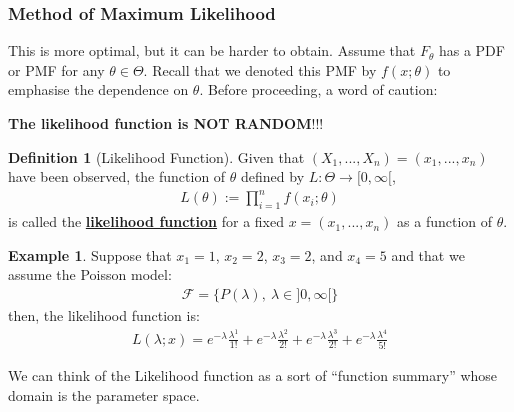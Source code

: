 \documentclass[11pt]{scrartcl}
\theoremstyle{definition}
\newtheorem{definition}{Definition}
\newtheorem{ex}{Example}
\theoremstyle{remark}
\newcommand{\dfn}[1]{\textbf{\underline{#1}}}
\newcommand{\dist}[0]{\mathcal{F}}
\begin{document}
{	

\subsubsection{Method of Maximum Likelihood}
This is more optimal, but it can be harder to obtain. Assume that $F_\theta$ has a PDF or PMF for any $\theta \in \Theta$. Recall that we denoted this PMF by $f(x; \theta)$ to emphasise the dependence on $\theta$. Before proceeding, a word of caution: 

\begin{center}
	\textbf{The likelihood function is NOT RANDOM}!!! 
\end{center}

\begin{definition}[Likelihood Function]
	Given that $(X_1, ..., X_n) = (x_1, ..., x_n)$ have been observed, the function of $\theta$ defined by $L: \Theta \rightarrow [0, \infty[$,
	\begin{align}
		L(\theta) := \prod_{i=1}^n f(x_i; \theta) 
	\end{align}
	is called the \dfn{likelihood function} for a fixed $x = (x_1, ..., x_n)$ as a function of $\theta$. 
\end{definition}

\begin{ex} 
	Suppose that $x_1 = 1$, $x_2 = 2$, $x_3 = 2$, and $x_4 =5$ and that we assume the Poisson model: 
	\begin{align*}
		\dist = \{ P(\lambda),\ \lambda \in ]0, \infty[ \} 	
	\end{align*}
	then, the likelihood function is: 
	\begin{align*}
		L(\lambda; x) = e^{-\lambda} \frac{\lambda^1}{1!}	+  e^{-\lambda} \frac{\lambda^2}{2!} +  e^{-\lambda} \frac{\lambda^3}{2!} +  e^{-\lambda} \frac{\lambda^4}{5!}
	\end{align*}
\end{ex}

We can think of the Likelihood function as a sort of ``function summary'' whose domain is the parameter space. 


}
\end{document}
